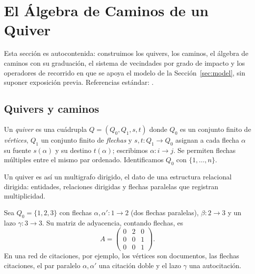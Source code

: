 \documentclass[runningheads]{llncs}
\newcommand{\Adj}{A}
\begin{document}
\section{El Álgebra de Caminos de un Quiver}\label{sec:algebra}

Esta sección es autocontenida: construimos los quivers, los caminos, el álgebra
de caminos con su graduación, el sistema de vecindades por grado de impacto y
los operadores de recorrido en que se apoya el modelo de la
Sección~\ref{sec:model}, sin suponer exposición previa. Referencias estándar:
\cite{schiffler2014quiver,assem2006elements}.

\subsection{Quivers y caminos}

\begin{definition}
Un \emph{quiver} es una cuádrupla $Q=(Q_0,Q_1,s,t)$ donde $Q_0$ es un conjunto
finito de \emph{vértices}, $Q_1$ un conjunto finito de \emph{flechas} y
$s,t\colon Q_1\to Q_0$ asignan a cada flecha $\alpha$ su fuente $s(\alpha)$ y
su destino $t(\alpha)$; escribimos $\alpha\colon i\to j$. Se permiten flechas
múltiples entre el mismo par ordenado. Identificamos $Q_0$ con $\{1,\dots,n\}$.
\end{definition}

Un quiver es así un multigrafo dirigido, el dato de una estructura relacional
dirigida: entidades, relaciones dirigidas y flechas paralelas que registran
multiplicidad.

\begin{example}\label{ex:firstquiver}
Sea $Q_0=\{1,2,3\}$ con flechas $\alpha,\alpha'\colon 1\to 2$ (dos flechas
paralelas), $\beta\colon 2\to 3$ y un lazo $\gamma\colon 3\to 3$. Su matriz de
adyacencia, contando flechas, es
\[
  \Adj=\begin{pmatrix}0&2&0\\0&0&1\\0&0&1\end{pmatrix}.
\]
En una red de citaciones, por ejemplo, los vértices son documentos, las flechas
citaciones, el par paralelo $\alpha,\alpha'$ una citación doble y el lazo
$\gamma$ una autocitación.
\end{example}
\end{document}
